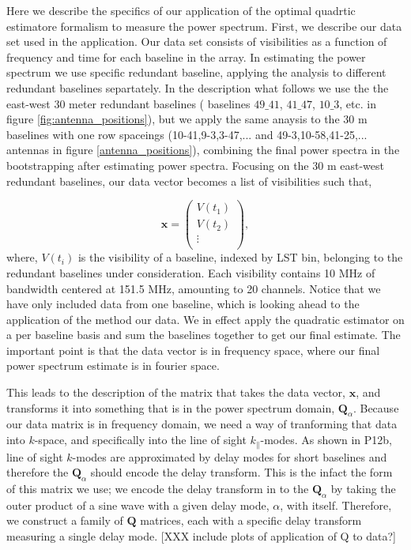 \documentclass[twocolumn,numberedappendix]{emulateapj} \shorttitle{PSA64}
\begin{document}
Here we describe the specifics of our application of the optimal quadrtic
estimatore formalism to measure the power spectrum. First, we describe our data
set used in the application. Our data set consists of visibilities as a function
of frequency and time for each baseline in the array. In estimating the power
spectrum we use specific redundant baseline, applying the analysis to
different redundant baselines separtately. In the description what follows we
use the the east-west 30 meter redundant baselines ( baselines $49\_41$,
$41\_47$, $10\_3$, etc. in figure \ref{fig:antenna_positions}), but we apply the
same anaysis to the 30 m baselines with one row spaceings (10-41,9-3,3-47,...
and 49-3,10-58,41-25,... antennas in figure \ref{antenna_positions}), combining
the final power spectra in the bootstrapping after estimating power spectra.
Focusing on the 30 m east-west redundant baselines, our data vector becomes a
list of visibilities such that, 

\begin{equation}
\label{eqn:xvectdef}
\mathbf{x} = \left( \begin{array}{c}
V (t_{1}) \\
V (t_{2}) \\
\vdots \\
\end{array}
\right), 
\end{equation}
where, $V(t_{i})$ is the visibility of a baseline, indexed by LST bin,
belonging to the redundant baselines under consideration. Each visibility
contains 10 MHz of bandwidth centered at 151.5 MHz, amounting to 20 channels. 
Notice that we have only included data from one baseline, which is looking ahead
to the application of the method our data. We in effect apply the quadratic
estimator on a per baseline basis and sum the baselines together to get our
final estimate. The important point is that the data vector is in frequency
space, where our final power spectrum estimate is in fourier space. 

This leads to the description of the matrix that takes the data vector,
$\mathbf{x}$, and transforms it into something that is in the power spectrum
domain, $\mathbf{Q}_{\alpha}$. Because our data matrix is in frequency domain,
we need a way of tranforming that data into $k$-space, and specifically into
the line of sight $k_{\parallel}$-modes. As shown in P12b,
line of sight $k$-modes are approximated by delay modes for short baselines and
therefore the $\mathbf{Q}_{\alpha}$ should encode the delay transform. This is
the infact the form of this matrix we use; we encode the delay transform in to
the $\mathbf{Q}_{\alpha}$ by taking the outer product of a sine wave with a
given delay mode, $\alpha$,  with itself.  Therefore, we construct a family of
$\mathbf{Q}$ matrices, each with a specific delay transform measuring a single
delay mode. [XXX include plots of application of Q to data?]
\end{document}
